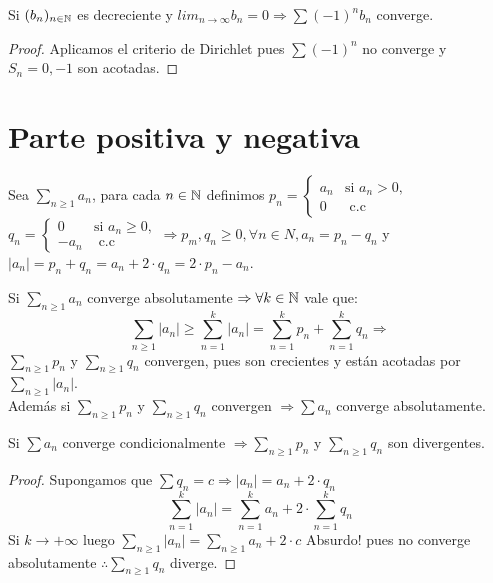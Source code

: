 \begin{corollary}
  Si $(b_n)_{n \in \mathbb{N}}$ es decreciente y $lim_{n \to \infty} b_n = 0 \Rightarrow \sum (-1)^n b_n$ converge.
  \begin{proof}
    Aplicamos el criterio de Dirichlet pues $\sum (-1)^n$ no converge y $S_n = 0, -1$ son acotadas.
  \end{proof}
\end{corollary}

\section{Parte positiva y negativa}

\begin{definition}
  Sea $\sum_{n \geq 1} a_n$, para cada $n \in \mathbb{N}$ definimos $p_n = \begin{cases}
    a_n & \text{si } a_n > 0, \\
    0 & \text{ c.c }
  \end{cases}$ \\
  $q_n = \begin{cases}
    0 & \text{si } a_n \geq 0, \\
    -a_n & \text{ c.c }
  \end{cases} \Rightarrow p_m, q_n \geq 0, \forall n \in N, a_n = p_n - q_n$ y $|a_n| = p_n + q_n = a_n + 2 \cdot q_n = 2 \cdot p_n - a_n$.  
\end{definition}

\begin{note}
  Si $\sum_{n \geq 1} a_n$ converge absolutamente $\Rightarrow \forall k \in \mathbb{N}$ vale que:
  \begin{equation}
    \sum_{n \geq 1} |a_n| \geq \sum_{n = 1}^k |a_n| = \sum_{n = 1}^k p_n + \sum_{n = 1}^k q_n \Rightarrow 
  \end{equation}
  $\sum_{n \geq 1} p_n$ y $\sum_{n \geq 1} q_n$ convergen, pues son crecientes y están acotadas por $\sum_{n \geq 1} |a_n|$. \\

  Además si $\sum_{n \geq 1} p_n$ y $\sum_{n \geq 1} q_n$ convergen $\Rightarrow \sum a_n$ converge absolutamente.
\end{note}

\begin{theorem}
  Si $\sum a_n$ converge condicionalmente $\Rightarrow \sum_{n \geq 1} p_n$ y $\sum_{n \geq 1} q_n$ son divergentes.

  \begin{proof}
    Supongamos que $\sum q_n = c \Rightarrow |a_n| = a_n + 2 \cdot q_n$ \\
    \begin{equation}
      \sum_{n = 1}^k |a_n| = \sum_{n = 1}^k a_n + 2 \cdot \sum_{n = 1}^k q_n
    \end{equation}
    Si $k \to +\infty$ luego $\sum_{n \geq 1} |a_n| = \sum_{n \geq 1} a_n + 2 \cdot c$ Absurdo! pues no converge absolutamente $\therefore \sum_{n \geq 1} q_n$ diverge. 
  \end{proof}
\end{theorem}

